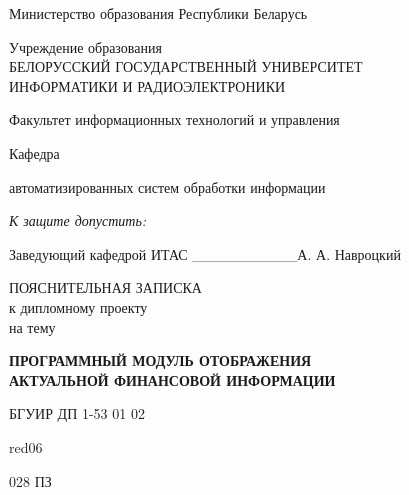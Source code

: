 \thispagestyle{empty}
\setlength{\parindent}{0ex} %

{\centering{}
  Министерство образования Республики Беларусь\par
}

\bigskip
{\centering{}
  Учреждение образования \\
  БЕЛОРУССКИЙ ГОСУДАРСТВЕННЫЙ УНИВЕРСИТЕТ \\
  ИНФОРМАТИКИ И РАДИОЭЛЕКТРОНИКИ
  \par
}

\bigskip
Факультет информационных технологий и управления

\smallskip
\parbox{\widthof{Факультет}}{Кафедра}
автоматизированных систем обработки информации

\vspace{\baselineskip}
\hfill
\begin{minipage}{.4\textwidth}
  {\raggedright{}
    \textit{К защите допустить:}

    \smallskip
    Заведующий кафедрой ИТАС
    \_\_\_\_\_\_\_\_\_\_А. А. Навроцкий\par
  }
\end{minipage}

\vspace{3\baselineskip}

{\centering{}
  ПОЯСНИТЕЛЬНАЯ ЗАПИСКА \\
  к дипломному проекту \\
  на тему\par
}

\bigskip
{\centering{}
  \textbf{ПРОГРАММНЫЙ МОДУЛЬ ОТОБРАЖЕНИЯ \\ АКТУАЛЬНОЙ ФИНАНСОВОЙ ИНФОРМАЦИИ}\par
}

\bigskip
{\centering{}
  БГУИР ДП 1-53 01 02 \begin{color}{red}06\end{color} 028 ПЗ \par
}

\vspace{3\baselineskip}

